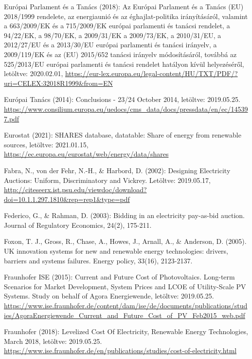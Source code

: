 \documentclass[twoside, magyar, showtrims]{corvinusphd}
\begin{document}
\begin{thebibliography}{99}
Európai Parlament és a Tanács (2018): Az Európai Parlament és a Tanács (EU) 2018/1999 rendelete, az energiaunió és az éghajlat-politika irányításáról, valamint a 663/2009/EK és a 715/2009/EK európai parlamenti és tanácsi rendelet, a 94/22/EK, a 98/70/EK, a 2009/31/EK a 2009/73/EK, a 2010/31/EU, a 2012/27/EU és a 2013/30/EU európai parlamenti és tanácsi irányelv, a 2009/119/EK és az (EU) 2015/652 tanácsi irányelv módosításáról, továbbá az 525/2013/EU európai parlamenti és tanácsi rendelet hatályon kívül helyezéséről,
letöltve: 2020.02.01, 
\url{https://eur-lex.europa.eu/legal-content/HU/TXT/PDF/?uri=CELEX:32018R1999&from=EN} 

Európai Tanács (2014): Conclusions - 23/24 October 2014, letöltve: 2019.05.25.
\url{https://www.consilium.europa.eu/uedocs/cms\_data/docs/pressdata/en/ec/145397.pdf}

Eurostat (2021): SHARES database, datatable: Share of energy from renewable sources, letöltve: 2021.01.15,
\url{https://ec.europa.eu/eurostat/web/energy/data/shares}

Fabra, N., von der Fehr, N.-H., \& Harbord, D. (2002): Designing Electricity Auctions: Uniform, Discriminatory and Vickrey. Letöltve: 2019.05.17,
\url{http://citeseerx.ist.psu.edu/viewdoc/download?doi=10.1.1.297.1810\&rep=rep1\&type=pdf}

Federico, G., \& Rahman, D. (2003): Bidding in an electricity pay-as-bid auction. Journal of Regulatory Economics, 24(2), 175-211.

Foxon, T. J., Gross, R., Chase, A., Howes, J., Arnall, A., \& Anderson, D. (2005). UK innovation systems for new and renewable energy technologies: drivers, barriers and systems failures. Energy policy, 33(16), 2123-2137.

Fraunhofer ISE (2015): Current and Future Cost of Photovoltaics. Long-term Scenarios for Market Development, System Prices and LCOE of Utility-Scale PV Systems. Study on behalf of Agora Energiewende, letöltve: 2019.05.25.
\url{https://www.ise.fraunhofer.de/content/dam/ise/de/documents/publications/studies/AgoraEnergiewende\_Current\_and\_Future\_Cost\_of\_PV\_Feb2015\_web.pdf}

Fraunhofer (2018): Levelized Cost Of Electricity, Renewable Energy Technologies, March 2018, letöltve: 2019.05.25.
\url{https://www.ise.fraunhofer.de/en/publications/studies/cost-of-electricity.html}


\end{thebibliography}
\end{document}
